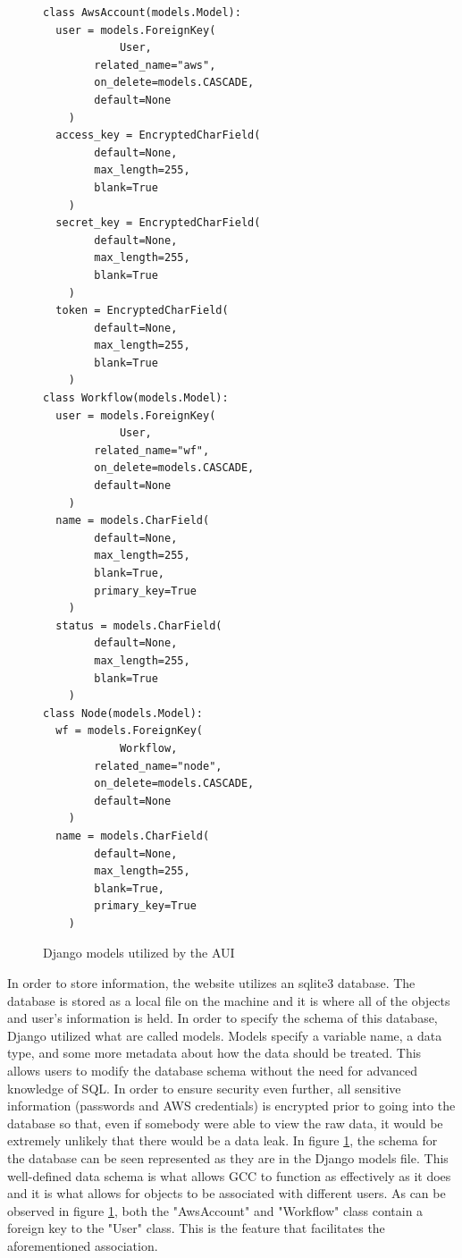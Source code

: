 \documentclass[fleqn,10pt]{SelfArx} %
\begin{document}
\begin{figure}[ht!]
\centering
\begin{tcolorbox}[boxrule=0.5pt,colback=cyan!15!white]
\begin{lstlisting}[basicstyle=\footnotesize, frame=lines]
class AwsAccount(models.Model):
  user = models.ForeignKey(
    		User,
		related_name="aws",
		on_delete=models.CASCADE,
		default=None
  	)
  access_key = EncryptedCharField(
		default=None,
		max_length=255,
		blank=True
	)
  secret_key = EncryptedCharField(
		default=None,
		max_length=255,
		blank=True
	)
  token = EncryptedCharField(
		default=None,
		max_length=255,
		blank=True
	)
class Workflow(models.Model):
  user = models.ForeignKey(
    		User,
		related_name="wf",
		on_delete=models.CASCADE,
		default=None
  	)
  name = models.CharField(
		default=None,
		max_length=255,
		blank=True,
		primary_key=True
	)
  status = models.CharField(
		default=None,
		max_length=255,
		blank=True
	)
class Node(models.Model):
  wf = models.ForeignKey(
    		Workflow,
		related_name="node",
		on_delete=models.CASCADE,
		default=None
  	)
  name = models.CharField(
		default=None,
		max_length=255,
		blank=True,
		primary_key=True
	)
\end{lstlisting}
\end{tcolorbox}
\caption{Django models utilized by the AUI}
\label{fig:djangomodels}
\end{figure}

In order to store information, the website utilizes an sqlite3 database. The database is stored as a local file on the machine and it is where all of the objects and user's information is held. In order to specify the schema of this database, Django utilized what are called models. Models specify a variable name, a data type, and some more metadata about how the data should be treated. This allows users to modify the database schema without the need for advanced knowledge of SQL. In order to ensure security even further, all sensitive information (passwords and AWS credentials) is encrypted prior to going into the database so that, even if somebody were able to view the raw data, it would be extremely unlikely that there would be a data leak. In figure \ref{fig:djangomodels}, the schema for the database can be seen represented as they are in the Django models file. This well-defined data schema is what allows GCC to function as effectively as it does and it is what allows for objects to be associated with different users. As can be observed in figure \ref{fig:djangomodels}, both the "AwsAccount" and "Workflow" class contain a foreign key to the "User" class. This is the feature that facilitates the aforementioned association.
\end{document}
